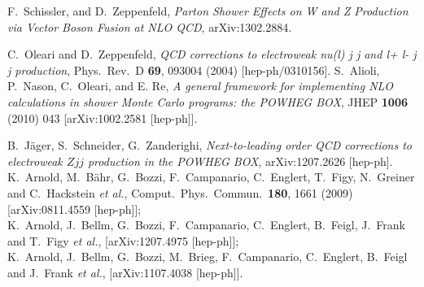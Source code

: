\documentclass[a4paper,11pt]{article}
\begin{document}
%
\begin{thebibliography}{99}

 F.~Schissler, and D.~Zeppenfeld, {\em Parton Shower Effects on W and Z Production
 via Vector Boson Fusion at NLO QCD}, arXiv:1302.2884. 

  C.~Oleari and D.~Zeppenfeld,
  {\em QCD corrections to electroweak nu(l) j j and l+ l- j j production},
  Phys.\ Rev.\ D {\bf 69}, 093004 (2004)
  [hep-ph/0310156].
 S.~Alioli, P.~Nason, C.~Oleari, and E. Re, {\em
    A general framework for implementing NLO calculations in shower
    Monte Carlo programs: the POWHEG BOX}, JHEP {\bf 1006} (2010)
  043  [arXiv:1002.2581 [hep-ph]].
  
   B.~J\"ager, S.~Schneider, G.~Zanderighi, {\em
    Next-to-leading order QCD corrections to electroweak $Zjj$ 
    production in the POWHEG BOX}, arXiv:1207.2626 [hep-ph].
  K.~Arnold, M.~B{\"a}hr, G.~Bozzi, F.~Campanario, C.~Englert, T.~Figy, N.~Greiner and C.~Hackstein {\it et al.},
  Comput.\ Phys.\ Commun.\  {\bf 180}, 1661 (2009)
  [arXiv:0811.4559 [hep-ph]];\\
  K.~Arnold, J.~Bellm, G.~Bozzi, F.~Campanario, C.~Englert, B.~Feigl, J.~Frank and T.~Figy {\it et al.},
  [arXiv:1207.4975 [hep-ph]];\\
  K.~Arnold, J.~Bellm, G.~Bozzi, M.~Brieg, F.~Campanario, C.~Englert, B.~Feigl and J.~Frank {\it et al.},
  [arXiv:1107.4038 [hep-ph]].

% 
\end{thebibliography}
\end{document}
